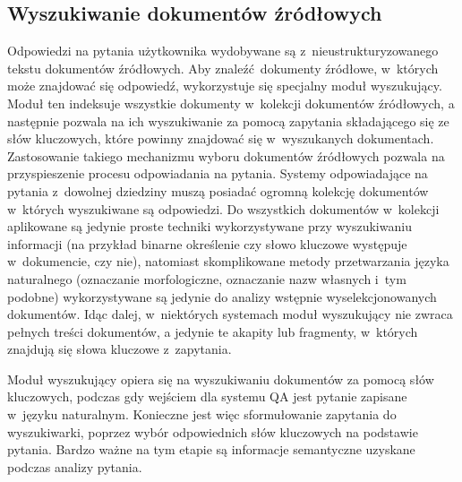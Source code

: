 \documentclass[a4paper, twoside, openright, 12pt]{report}
\begin{document}
        \subsection{Wyszukiwanie dokumentów źródłowych} \label{QUERYGENERATION}
            Odpowiedzi na pytania użytkownika wydobywane są z~nieustrukturyzowanego tekstu dokumentów źródłowych. Aby
            znaleźć dokumenty źródłowe, w~których może znajdować się odpowiedź, wykorzystuje się specjalny moduł
            wyszukujący. Moduł ten indeksuje wszystkie dokumenty w~kolekcji dokumentów źródłowych, a następnie pozwala
            na ich wyszukiwanie za pomocą zapytania składającego się ze słów kluczowych, które powinny znajdować się
            w~wyszukanych dokumentach. Zastosowanie takiego mechanizmu wyboru dokumentów źródłowych pozwala na
            przyspieszenie procesu odpowiadania na pytania\cite{PASSAGERETRIVAL}. Systemy odpowiadające na pytania z~dowolnej dziedziny muszą
            posiadać ogromną kolekcję dokumentów w~których wyszukiwane są odpowiedzi. Do wszystkich dokumentów w~kolekcji
            aplikowane są jedynie proste techniki wykorzystywane przy wyszukiwaniu informacji (na przykład binarne
            określenie czy słowo kluczowe występuje w~dokumencie, czy nie), natomiast skomplikowane metody przetwarzania
            języka naturalnego (oznaczanie morfologiczne, oznaczanie nazw własnych i~tym podobne) wykorzystywane są jedynie
            do analizy wstępnie wyselekcjonowanych dokumentów. Idąc dalej, w~niektórych systemach moduł wyszukujący nie
            zwraca pełnych treści dokumentów, a jedynie te akapity lub fragmenty, w~których znajdują się słowa kluczowe
            z~zapytania.

            Moduł wyszukujący opiera się na wyszukiwaniu dokumentów za pomocą słów kluczowych, podczas gdy wejściem
            dla systemu QA jest pytanie zapisane w~języku naturalnym. Konieczne jest więc sformułowanie zapytania
            do wyszukiwarki, poprzez wybór odpowiednich słów kluczowych na podstawie pytania. Bardzo ważne na tym
            etapie są informacje semantyczne uzyskane podczas analizy pytania.
\end{document}
